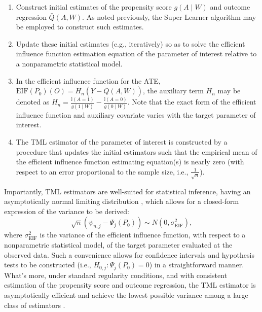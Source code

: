 \documentclass[9pt,a4paper,]{extarticle}
\theoremstyle{definition}
\theoremstyle{definition}
\theoremstyle{definition}
\theoremstyle{remark}
\begin{document}
\begin{enumerate}
\def\labelenumi{\arabic{enumi}.}
\item
  Construct initial estimates of the propensity score \(g(A \mid W)\) and outcome
  regression \(\bar{Q}(A, W)\). As noted previously, the Super Learner algorithm
  may be employed to construct such estimates.
\item
  Update these initial estimates (e.g., iteratively) so as to solve the
  efficient influence function estimation equation of the parameter of interest
  relative to a nonparametric statistical model.
\item
  In the efficient influence function for the ATE, \(\text{EIF}(P_0)(O) = H_n(Y - \bar{Q}(A, W))\), the auxiliary term \(H_n\) may be denoted as
  \(H_n = \frac{\mathbb{I}(A = 1)}{g(1 \mid W)} - \frac{\mathbb{I}(A = 0)}{g(0 \mid W)}\). Note that the exact form of the
  efficient influence function and auxiliary covariate varies with the target
  parameter of interest.
\item
  The TML estimator of the parameter of interest is constructed by a procedure
  that updates the initial estimators such that the empirical mean of the
  efficient influence function estimating equation(s) is nearly zero (with
  respect to an error proportional to the sample size, i.e.,
  \(\frac{1}{\sqrt{n}}\)).
\end{enumerate}

Importantly, TML estimators are well-suited for statistical inference, having an
asymptotically normal limiting distribution \citep[
\citet{vdl2006targeted}]{tsiatis2007semiparametric}, which allows for a closed-form expression of the variance
to be derived:
\begin{equation}\label{eqn:lim_psi}
  \sqrt{n}(\psi_{n, j} - \Psi_j(P_0)) \sim N(0, \sigma_{\text{EIF}}^2),
\end{equation}
where \(\sigma_{\text{EIF}}^2\) is the variance of the efficient influence
function, with respect to a nonparametric statistical model, of the target
parameter evaluated at the observed data. Such a convenience allows for
confidence intervals and hypothesis tests to be constructed (i.e.,
\(H_{0, j}: \Psi_j(P_0) = 0\)) in a straightforward manner. What's more, under
standard regularity conditions, and with consistent estimation of the propensity
score and outcome regression, the TML estimator is asymptotically efficient and
achieve the lowest possible variance among a large class of estimators
\citep{bickel1993efficient}.
\end{document}
